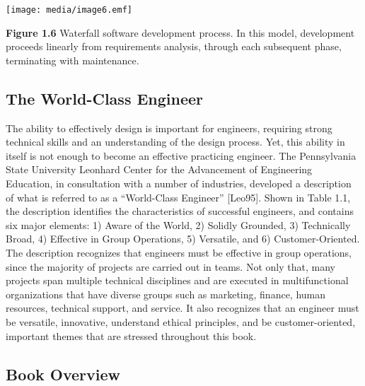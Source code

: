 \texttt{[image: media/image6.emf]}

\textbf{Figure 1.6} Waterfall software development process. In this
model, development proceeds linearly from requirements analysis, through
each subsequent phase, terminating with maintenance.

\subsection{The World-Class Engineer}\label{the-world-class-engineer}

The ability to effectively design is important for engineers, requiring
strong technical skills and an understanding of the design process. Yet,
this ability in itself is not enough to become an effective practicing
engineer. The Pennsylvania State University Leonhard Center for the
Advancement of Engineering Education, in consultation with a number of
industries, developed a description of what is referred to as a
``World-Class Engineer'' {[}Leo95{]}. Shown in Table 1.1, the
description identifies the characteristics of successful engineers, and
contains six major elements: 1) Aware of the World, 2) Solidly Grounded,
3) Technically Broad, 4) Effective in Group Operations, 5) Versatile,
and 6) Customer-Oriented. The description recognizes that engineers must
be effective in group operations, since the majority of projects are
carried out in teams. Not only that, many projects span multiple
technical disciplines and are executed in multifunctional organizations
that have diverse groups such as marketing, finance, human resources,
technical support, and service. It also recognizes that an engineer must
be versatile, innovative, understand ethical principles, and be
customer-oriented, important themes that are stressed throughout this
book.

\subsection{Book Overview}\label{book-overview}

